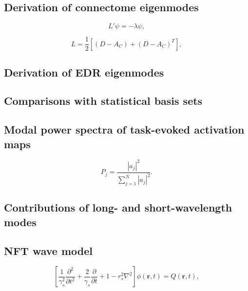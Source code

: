 \documentclass[sn-mathphys-num]{sn-jnl}%
\theoremstyle{thmstyleone}%
\theoremstyle{thmstyletwo}%
\theoremstyle{thmstylethree}%
\begin{document}
\subsection{Derivation of connectome eigenmodes} \label{sec:connectome_derivation}

\begin{equation}\label{eq:connectome_eigenmodes}
	L' \psi = - \lambda \psi,
\end{equation}


\begin{equation}\label{eq:unnormalized_Laplacian}
	L = \frac{1}{2} [ (D-A_C) + (D-A_C)^T ],
\end{equation}


\subsection{Derivation of EDR eigenmodes} \label{sec:EDR_derivation}


\subsection{Comparisons with statistical basis sets} \label{sec:sets_comparisons}


\subsection{Modal power spectra of task-evoked activation maps} \label{sec:modal_power}


\begin{equation}\label{eq:normalized_power}
	P_j = \frac{|a_j|^2}{\sum_{j=1}^{N} |a_j|^2 }.
\end{equation}


\subsection{Contributions of long- and short-wavelength modes} \label{sec:wavelength_contributions}


\subsection{NFT wave model} \label{sec:NFT_model}


\begin{equation}\label{eq:NFT_wave_model}
	[\frac{1}{\gamma_s^2} \frac{\partial ^2}{\partial t^2} + 
	\frac{2}{\gamma_s} \frac{\partial}{\partial t} + 1 - r_s^2 \nabla^2] 
	\phi(\textbf{r}, t) = Q(\textbf{r}, t),
\end{equation}
\end{document}
